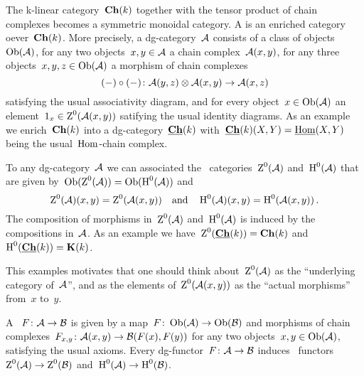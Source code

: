 \documentclass[a4paper,10pt]{scrartcl}
\begin{document}
The k-linear category~$\mathbf{Ch}(k)$ together with the tensor product of chain complexes becomes a symmetric monoidal category.
A  is an enriched category oever~$\mathbf{Ch}(k)$.
More precisely, a dg-category~$\mathcal{A}$ consists of a class of objects~$\operatorname{Ob}(\mathcal{A})$, for any two objects~$x, y \in \mathcal{A}$ a chain complex~$\mathcal{A}(x,y)$, for any three objects~$x, y, z \in \operatorname{Ob}(\mathcal{A})$ a morphism of chain complexes
\[
  (-) \circ (-)
  \colon
  \mathcal{A}(y,z) \otimes \mathcal{A}(x,y)
  \to
  \mathcal{A}(x,z)
\]
satisfying the usual associativity diagram, and for every object~$x \in \operatorname{Ob}(\mathcal{A})$ an element~$1_x \in \operatorname{Z}^0(\mathcal{A}(x,y))$ satifying the usual identity diagrams.
As an example we enrich~$\mathbf{Ch}(k)$ into a dg-category~$\underline{\mathbf{Ch}}(k)$ with~$\underline{\mathbf{Ch}}(k)(X,Y) = \underline{\operatorname{Hom}}(X,Y)$ being the usual~$\operatorname{Hom}$-chain complex.

To any dg-category~$\mathcal{A}$ we can associated the~{\klinear} categories~$\operatorname{Z}^0(\mathcal{A})$ and~$\operatorname{H}^0(\mathcal{A})$ that are given by~$\operatorname{Ob}(\operatorname{Z}^0(\mathcal{A})) = \operatorname{Ob}(\operatorname{H}^0(\mathcal{A}))$ and
\[
  \operatorname{Z}^0(\mathcal{A})(x,y)
  =
  \operatorname{Z}^0(\mathcal{A}(x,y))
  \quad\text{and}\quad
  \operatorname{H}^0(\mathcal{A})(x,y)
  =
  \operatorname{H}^0(\mathcal{A}(x,y)) \,.
\]
The composition of morphisms in~$\operatorname{Z}^0(\mathcal{A})$ and~$\operatorname{H}^0(\mathcal{A})$ is induced by the compositions in~$\mathcal{A}$.
As an example we have~$\operatorname{Z}^0(\underline{\mathbf{Ch}}(k)) = \mathbf{Ch}(k)$ and~$\operatorname{H}^0(\underline{\mathbf{Ch}}(k)) = \mathbf{K}(k)$.

This examples motivates that one should think about~$\operatorname{Z}^0(\mathcal{A})$ as the \enquote{underlying~{\klinear} category of~$\mathcal{A}$}, and as the elements of~$\operatorname{Z}^0(\mathcal{A}(x,y))$ as the \enquote{actual morphisms} from~$x$ to~$y$.

A ~$F \colon \mathcal{A} \to \mathcal{B}$ is given by a map~$F \colon \operatorname{Ob}(\mathcal{A}) \to \operatorname{Ob}(\mathcal{B})$ and morphisms of chain complexes~$F_{x,y} \colon \mathcal{A}(x,y) \to \mathcal{B}(F(x), F(y))$ for any two objects~$x, y \in \operatorname{Ob}(\mathcal{A})$, satisfying the usual axioms.
Every dg-functor~$F \colon \mathcal{A} \to \mathcal{B}$ induces~{\klinear} functors~$\operatorname{Z}^0(\mathcal{A}) \to \operatorname{Z}^0(\mathcal{B})$ and~$\operatorname{H}^0(\mathcal{A}) \to \operatorname{H}^0(\mathcal{B})$.
\end{document}
